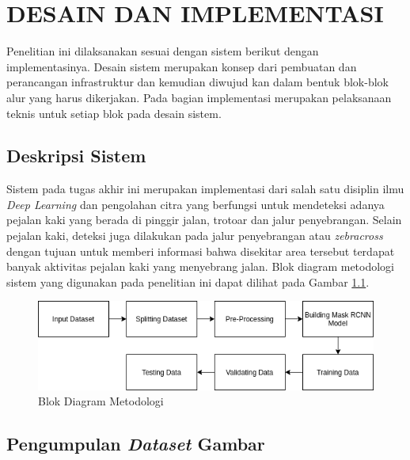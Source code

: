 \chapter{DESAIN DAN IMPLEMENTASI}
\label{chap:desainimplementasi}


Penelitian ini dilaksanakan sesuai dengan sistem berikut dengan implementasinya. Desain sistem merupakan konsep dari pembuatan dan perancangan infrastruktur dan kemudian diwujud kan dalam bentuk blok-blok alur yang harus dikerjakan. Pada bagian implementasi merupakan pelaksanaan teknis untuk setiap blok pada desain sistem.

\section{Deskripsi Sistem}
\label{sec:deskripsisistem}

Sistem pada tugas akhir ini merupakan implementasi dari salah satu disiplin ilmu \textit{Deep Learning} dan pengolahan citra yang berfungsi untuk mendeteksi adanya pejalan kaki yang berada di pinggir jalan, trotoar dan jalur penyebrangan. Selain pejalan kaki, deteksi juga dilakukan pada jalur penyebrangan atau \textit{zebracross} dengan tujuan untuk memberi informasi bahwa disekitar area tersebut terdapat banyak aktivitas pejalan kaki yang menyebrang jalan. Blok diagram metodologi sistem yang digunakan pada penelitian ini dapat dilihat pada Gambar \ref{fig:blok-diagram}.

\begin{figure}[ht]
	\centering
	\includegraphics[scale=0.5]{gambar/blok-diagram.png}
	\caption{Blok Diagram Metodologi}
	\label{fig:blok-diagram}
\end{figure}  

\section{Pengumpulan \textit{Dataset} Gambar}
\label{sec:pengumpulandatagambar} 

